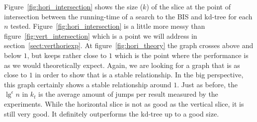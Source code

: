 Figure~\ref{fig:hori_intersection} shows the size ($k$) of the slice at the point of intersection between the running-time of a search to the BIS and kd-tree for each $n$ tested. Figure~\ref{fig:hori_intersection} is a little more messy than figure~\ref{fig:vert_intersection} which is a point we will address in section~\ref{sect:verthoriexp}. At figure~\ref{fig:hori_theory} the graph crosses above and below $1$, but keeps rather close to $1$ which is the point where the performance is as we would theoretically expect. Again, we are looking for a graph that is as close to $1$ in order to show that is a stable relationship. In the big perspective, this graph certainly shows a stable relationship around $1$. Just as before, the $\lg^\epsilon n$ in $k_t$ is the average amount of jumps per result measured by the experiments. While the horizontal slice is not as good as the vertical slice, it is still very good. It definitely outperforms the kd-tree up to a good size.

